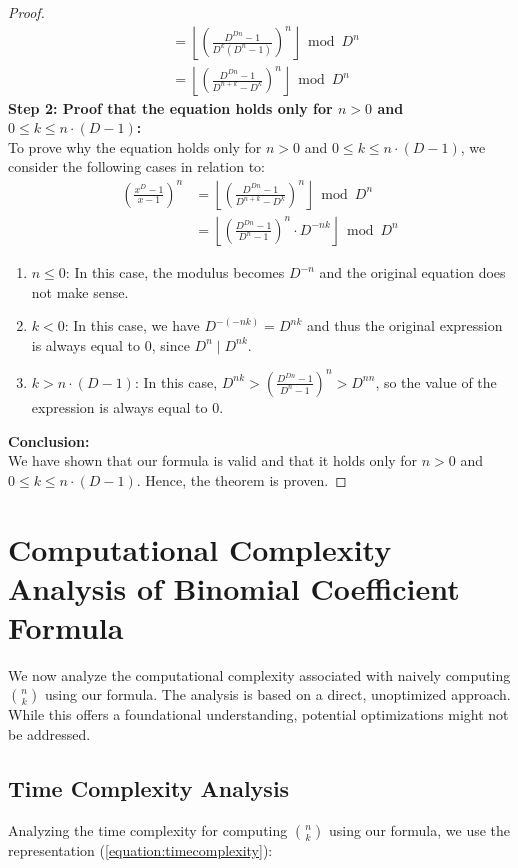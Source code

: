 \documentclass{article}
\theoremstyle{plain}
\theoremstyle{definition}
\begin{document}
\begin{proof}
\begin{align}
&= \left\lfloor \left(\frac{D^{Dn} - 1}{D^k (D^{n} - 1)}\right)^n\right\rfloor \bmod D^n \\
&= \left\lfloor \left(\frac{D^{Dn} - 1}{D^{n+k} - D^k}\right)^n\right\rfloor \bmod D^n
\end{align}
\textbf{Step 2: Proof that the equation holds only for $n > 0$ and $0 \leq k \leq n \cdot (D - 1)$:} \\
To prove why the equation holds only for $n > 0$ and $0 \leq k \leq n \cdot (D-1)$, we consider the following cases in relation to:
\begin{align}
[x^k] \left(\frac{x^{D}-1}{x-1}\right)^n &= \left\lfloor \left(\frac{D^{Dn} - 1}{D^{n+k} - D^k}\right)^n\right\rfloor \bmod D^n \\
&= \left\lfloor \left(\frac{D^{Dn} - 1}{D^{n} - 1}\right)^n \cdot D^{-n k}\right\rfloor \bmod D^n
\end{align}
\begin{enumerate}
\item $n \leq 0$: In this case, the modulus becomes $D^{-n}$ and the original equation does not make sense.
\item $k < 0$: In this case, we have $D^{-(-nk)} = D^{nk}$ and thus the original expression is always equal to $0$, since $D^{n} \mid D^{nk}$.
\item $k > n \cdot (D-1)$: In this case, $D^{nk} > \left(\frac{D^{Dn} - 1}{D^{n} - 1}\right)^{n} > D^{nn}$, so the value of the expression is always equal to $0$.
\end{enumerate}
\noindent
\textbf{Conclusion:}
\\
We have shown that our formula is valid and that it holds only for $n > 0$ and $0 \leq k \leq n \cdot (D - 1)$. Hence, the theorem is proven.
\end{proof}

\section{Computational Complexity Analysis of Binomial Coefficient Formula}
We now analyze the computational complexity associated with naively computing $\binom{n}{k}$ using our formula. The analysis is based on a direct, unoptimized approach. While this offers a foundational understanding, potential optimizations might not be addressed.

\subsection{Time Complexity Analysis}
Analyzing the time complexity for computing $\binom{n}{k}$ using our formula, we use the representation (\ref{equation:timecomplexity}):
\end{document}
